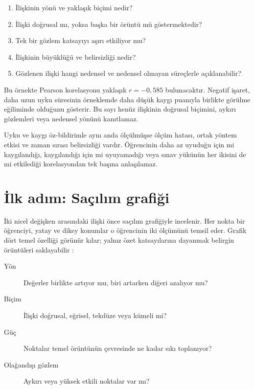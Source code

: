 \begin{enumerate}
  \item İlişkinin yönü ve yaklaşık biçimi nedir?
  \item İlişki doğrusal mı, yoksa başka bir örüntü mü göstermektedir?
  \item Tek bir gözlem katsayıyı aşırı etkiliyor mu?
  \item İlişkinin büyüklüğü ve belirsizliği nedir?
  \item Gözlenen ilişki hangi nedensel ve nedensel olmayan süreçlerle açıklanabilir?
\end{enumerate}


Bu örnekte Pearson korelasyonu yaklaşık $r=-0{,}585$ bulunacaktır. Negatif
işaret, daha uzun uyku süresinin örneklemde daha düşük kaygı puanıyla birlikte
görülme eğiliminde olduğunu gösterir. Bu sayı henüz ilişkinin doğrusal
biçimini, aykırı gözlemleri veya nedensel yönünü kanıtlamaz.

\begin{researchbox}
Uyku ve kaygı öz-bildirimle aynı anda ölçülmüşse ölçüm hatası, ortak yöntem
etkisi ve zaman sırası belirsizliği vardır. Öğrencinin daha az uyuduğu için mi
kaygılandığı, kaygılandığı için mi uyuyamadığı veya sınav yükünün her ikisini
de mi etkilediği korelasyondan tek başına anlaşılamaz.
\end{researchbox}

\section{İlk adım: Saçılım grafiği}

İki nicel değişken arasındaki ilişki önce saçılım grafiğiyle incelenir. Her
nokta bir öğrenciyi, yatay ve dikey konumlar o öğrencinin iki ölçümünü temsil
eder. Grafik dört temel özelliği görünür kılar; yalnız özet katsayılarına
dayanmak belirgin örüntüleri saklayabilir \cite{anscombe1973}:

\begin{description}
  \item[Yön] Değerler birlikte artıyor mu, biri artarken diğeri azalıyor mu?
  \item[Biçim] İlişki doğrusal, eğrisel, tekdüze veya kümeli mi?
  \item[Güç] Noktalar temel örüntünün çevresinde ne kadar sıkı toplanıyor?
  \item[Olağandışı gözlem] Aykırı veya yüksek etkili noktalar var mı?
\end{description}

